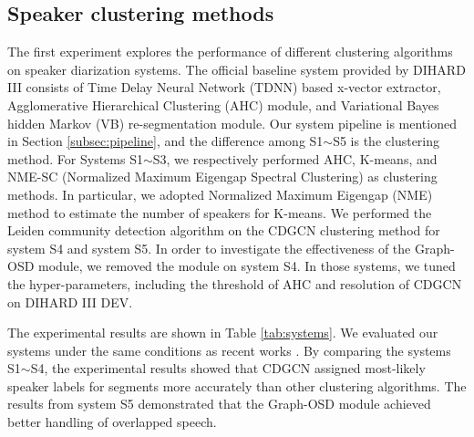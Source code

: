 \documentclass[10pt]{article}
\begin{document}
\subsection{Speaker clustering methods}
The first experiment explores the performance of different clustering algorithms on speaker diarization systems. The official baseline system provided by DIHARD III \cite{ryant2020third} consists of Time Delay Neural Network (TDNN) based x-vector extractor, Agglomerative Hierarchical Clustering (AHC) module, and Variational Bayes hidden Markov (VB) re-segmentation module. Our system pipeline is mentioned in Section \ref{subsec:pipeline}, and the difference among S1$\sim$S5 is the clustering method. For Systems S1$\sim$S3, we respectively performed AHC, K-means, and NME-SC (Normalized Maximum Eigengap Spectral Clustering)\cite{park2019auto} as clustering methods. In particular, we adopted Normalized Maximum Eigengap (NME)\cite{park2019auto} method to estimate the number of speakers for K-means. We performed the Leiden community detection algorithm on the CDGCN clustering method for system S4 and system S5. In order to investigate the effectiveness of the Graph-OSD module, we removed the module on system S4. In those systems, we tuned the hyper-parameters, including the threshold of AHC and resolution of CDGCN on DIHARD III DEV. 

The experimental results are shown in Table \ref{tab:systems}. We evaluated our systems under the same conditions as recent works \cite{ryant2020third}\cite{landini2021but}\cite{horiguchi2021hitachi}. By comparing the systems S1$\sim$S4, the experimental results showed that CDGCN assigned most-likely speaker labels for segments more accurately than other clustering algorithms. The results from system S5 demonstrated that the Graph-OSD module achieved better handling of overlapped speech.
\end{document}
